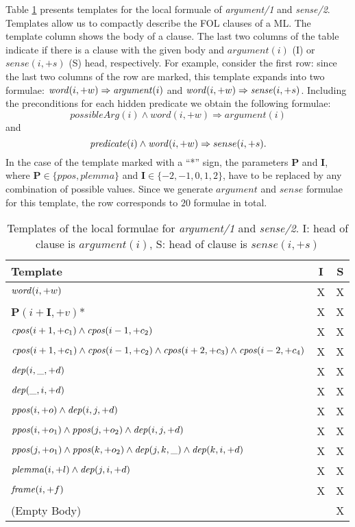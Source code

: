Table \ref{tbl:f1} presents templates for the local formuale of 
\emph{argument/1} and \emph{sense/2}. Templates allow us to compactly describe 
the FOL clauses of a ML. The template column shows the body of a clause. The 
last two columns of the table indicate if there is a clause with the given body 
and $argument(i)$ (I) or  $sense(i,+s)$ (S) head, respectively. For example, 
consider the first row: since the last two columns of the row are marked, this 
template expands into two formulae:
$\mathit{word}(i,+w) \Rightarrow \mathit{argument}(i)$ and $\mathit{word}(i,+w) \Rightarrow 
\mathit{sense}(i,+s)$.
Including the preconditions for each hidden predicate we obtain the following 
formulae:
\[\mathit{possibleArg}(i) \land \mathit{word}(i,+w) \Rightarrow 
\mathit{argument}(i)\] and \[\mathit{predicate}(i) \land \mathit{word}(i,+w) \Rightarrow 
sense(i,+s).\]  In the case of the template marked with a ``*'' sign, the 
parameters $\mathbf{P}$ and $\mathbf{I}$, where $\mathbf{P} \in \{ppos,plemma\}$ 
and $\mathbf{I} \in \{-2,-1,0,1,2\}$, have to be replaced by any combination of 
possible values. Since we generate $argument$ and $sense$ formulae for this 
template, the row corresponds to $20$ formulae in total.
\begin{table}
\centering
\begin{tabular}{|p{6cm}|c|c|}\hline
   Template       & I & S \\\hline
   $ \mathit{word}(i,+w)$  & X & X \\
   $ \mathbf{P}(i+\mathbf{I},+v)$*  & X & X \\
   $ \mathit{cpos}(i+1,+c_1) \land \mathit{cpos}(i-1,+c_2)$ & X & X\\
   $ \mathit{cpos}(i+1,+c_1) \land \mathit{cpos}(i-1,+c_2) \land \mathit{cpos}(i+2,+c_3) \land 
   \mathit{cpos}(i-2,+c_4)$ & X & X\\
   $ \mathit{dep}(i,\_,+d)$ & X & X\\
   $ \mathit{dep}(\_,i,+d)$ & X & X\\
   $ \mathit{ppos}(i,+o)  \land \mathit{dep}(i,j,+d)$ & X & X \\
   $ \mathit{ppos}(i,+o_1)  \land \mathit{ppos}(j,+o_2) \land \mathit{dep}(i,j,+d)$ & X & X \\
   $ \mathit{ppos}(j,+o_1)  \land \mathit{ppos}(k,+o_2) \land \mathit{dep}(j,k,\_) \land \mathit{dep}(k,i,+d)$ & 
   X & X \\
   $ \mathit{plemma}(i,+l) \land \mathit{dep}(j,i,+d)$ & X & X\\
   $ \mathit{frame}(i,+f)$ & X & X\\
   (Empty Body)             &   & X \\
\hline
\end{tabular}
\caption{Templates of the local formulae for \emph{argument/1} and 
\emph{sense/2}. I: head of clause is $argument(i)$, S: head of clause is 
$sense(i,+s)$}
\label{tbl:f1}
\end{table}

